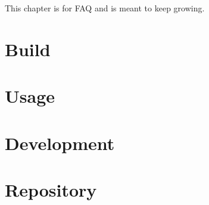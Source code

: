 
This chapter is for FAQ and is meant to keep growing.

\section{Build}
\label{sec:faq_build}


\section{Usage}
\label{sec:faq_usage}


\section{Development}
\label{sec:faq_development}


\section{Repository}
\label{sec:faq_repository}



